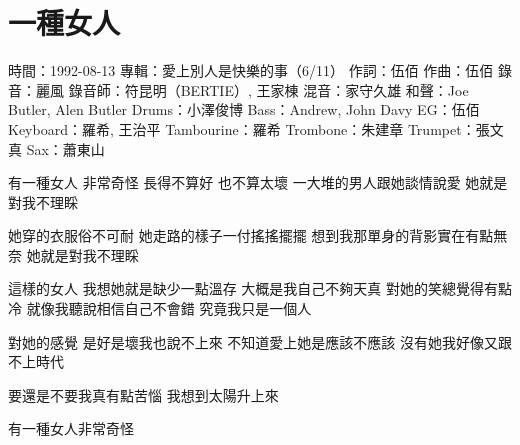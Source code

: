 \documentclass[UTF8,a4paper,oneside,twocolumn,12pt]{ctexbook}
\newcommand{\infopair}[2]{\textbullet #1：#2}
\newcommand{\zc}[1][伍佰]{\infopair{作詞}{#1}}
\newcommand{\zq}[1][伍佰]{\infopair{作曲}{#1}}
\newcommand{\zj}[1]{\infopair{專輯}{#1}}
\newcommand{\sj}[1]{\infopair{時間}{#1}}
\newenvironment{info}{\begin{flushleft}\kaishu
	}
	{\end{flushleft}\normalsize\yahei\par}
\newenvironment{lyric}{
	}
{}
\begin{document}
\section{一種女人}
\begin{info}
	\sj{1992-08-13}
	\zj{愛上別人是快樂的事（6/11）}
	\zc
	\zq
	\infopair{錄音}{麗風}
	\infopair{錄音師}{符昆明（BERTIE）, 王家棟}
	\infopair{混音}{家守久雄}
	\infopair{和聲}{Joe Butler, Alen Butler}
	\infopair{Drums}{小澤俊博}
	\infopair{Bass}{Andrew, John Davy}
	\infopair{EG}{伍佰}
	\infopair{Keyboard}{羅希, 王治平}
	\infopair{Tambourine}{羅希}
	\infopair{Trombone}{朱建章}
	\infopair{Trumpet}{張文真}
	\infopair{Sax}{蕭東山}
\end{info}
\begin{lyric}
	有一種女人   非常奇怪
	長得不算好   也不算太壞
	一大堆的男人跟她談情說愛
	她就是對我不理睬

	她穿的衣服俗不可耐
	她走路的樣子一付搖搖擺擺
	想到我那單身的背影實在有點無奈
	她就是對我不理睬

	這樣的女人  我想她就是缺少一點溫存
	大概是我自己不夠天真
	對她的笑總覺得有點冷
	就像我聽說相信自己不會錯
	究竟我只是一個人

	對她的感覺  是好是壞我也說不上來
	不知道愛上她是應該不應該
	沒有她我好像又跟不上時代

	要還是不要我真有點苦惱
	我想到太陽升上來

	有一種女人非常奇怪
\end{lyric}
\end{document}
